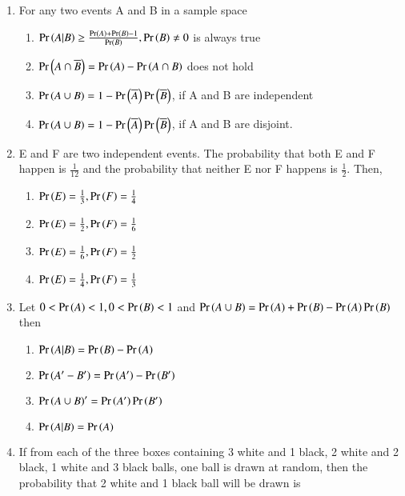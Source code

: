 \documentclass[journal,12pt,onecolumn,article]{IEEEtran}
\theoremstyle{remark}
\begin{document}
\begin{enumerate}[start=3]
\begin{enumerate}
\end{enumerate}
\item For any two events A and B in a sample space
\hfill{}
\begin{enumerate}
\item $\Pr\left(A|B\right)\geq \frac{\Pr\left(A\right)+\Pr\left(B\right)-1}{\Pr\left(B\right)}, \Pr\left(B\right)\neq 0$ is always true
\item $\Pr\left(A\cap \overline{B}\right)=\Pr\left(A\right)-\Pr\left(A\cap B\right)$ does not hold
\item $\Pr\left(A\cup B\right)=1-\Pr\left(\overline{A}\right)\Pr\left(\overline{B}\right)$, if A and B are independent
\item $\Pr\left(A\cup B\right)=1-\Pr\left(\overline{A}\right)\Pr\left(\overline{B}\right)$, if A and B are disjoint.
\end{enumerate}
\item E and F are two independent events. The probability that both E and F happen is $\frac{1}{12}$ and the probability that neither E nor F happens is $\frac{1}{2}$. Then,
\hfill{}
\begin{enumerate}
\item $\Pr\left(E\right)=\frac{1}{3},\Pr\left(F\right)=\frac{1}{4}$
\item $\Pr\left(E\right)=\frac{1}{2},\Pr\left(F\right)=\frac{1}{6}$
\item $\Pr\left(E\right)=\frac{1}{6},\Pr\left(F\right)=\frac{1}{2}$
\item $\Pr\left(E\right)=\frac{1}{4},\Pr\left(F\right)=\frac{1}{3}$
\end{enumerate}
\item Let $0<\Pr\left(A\right)<1,0<\Pr\left(B\right)<1$ and $\Pr\left(A\cup B\right)=\Pr\left(A\right)+\Pr\left(B\right)-\Pr\left(A\right)\Pr\left(B\right)$ then
\hfill{}
\begin{enumerate}
\item $\Pr\left(A|B\right)=\Pr\left(B\right)-\Pr\left(A\right)$
\item $\Pr\left(A'-B'\right)=\Pr\left(A'\right)-\Pr\left(B'\right)$
\item $\Pr\left(A\cup B\right)'=\Pr\left(A'\right)\Pr\left(B'\right)$
\item $\Pr\left(A|B\right)=\Pr\left(A\right)$
\end{enumerate}
\item If from each of the three boxes containing 3 white and 1 black, 2 white and 2 black, 1 white and 3 black balls, one ball is drawn at random, then the probability that 2 white and 1 black ball will be drawn is
\hfill{}
\begin{enumerate}
\end{enumerate}
\end{enumerate}
\end{document}
